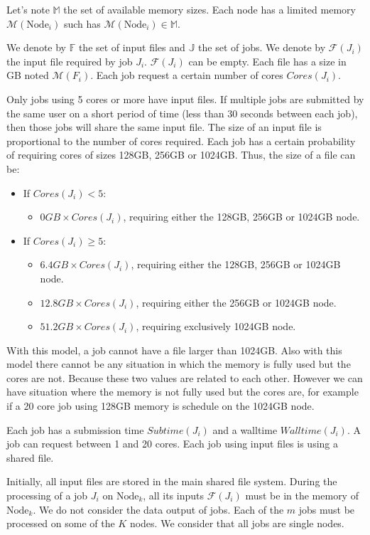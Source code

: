 \documentclass[a4paper]{article}
\newcommand{\Node}[1]{\ensuremath{\mathrm{Node}_{#1}}\xspace}
\newcommand{\inputs}{\ensuremath{\mathcal{F}}\xspace}
\newcommand{\memory}{\ensuremath{\mathcal{M}}\xspace}
\newcommand{\core}{\mathit{Cores}\xspace}
\newcommand{\submissiontime}{\mathit{Subtime}\xspace}
\newcommand{\walltime}{\mathit{Walltime}\xspace}
\newcommand{\fileset}{\ensuremath{\mathbb{F}}\xspace}
\newcommand{\jobset}{\ensuremath{\mathbb{J}}\xspace}
\begin{document}
Let's note $\mathbb{M}$ the set of available memory sizes.
Each node has a limited memory $\memory(\Node{i})$ such has $\memory(\Node{i}) \in \mathbb{M}$.

We denote by $\fileset$ the set of input files and $\jobset$ the set of jobs.
We denote by $\inputs(J_i)$ the input file required by job $J_i$. $\inputs(J_i)$ can be empty.
Each file has a size in GB noted $\memory(F_i)$. 
Each job request a certain number of cores $\core(J_i)$. 


Only jobs using 5 cores or more have input files.
If multiple jobs are submitted by the same user on a short period of time (less than 30 seconds between each job),
then those jobs will share the same input file.
The size of an input file is proportional to the number of cores required.
Each job has a certain probability of requiring cores of sizes 128GB, 256GB or 1024GB.
Thus, the size of a file can be:
\begin{itemize}
	\item If $\core(J_i) < 5$:
	\begin{itemize}
		\item $0GB \times \core(J_i)$, requiring either the 128GB, 256GB or 1024GB node.
	\end{itemize}
	\item If $\core(J_i) \ge 5$:
	\begin{itemize}
		\item $6.4GB \times \core(J_i)$, requiring either the 128GB, 256GB or 1024GB node.
		\item $12.8GB \times \core(J_i)$, requiring either the 256GB or 1024GB node.
		\item $51.2GB \times \core(J_i)$, requiring exclusively 1024GB node.
	\end{itemize}
\end{itemize}
With this model, a job cannot have a file larger than 1024GB.
Also with this model there cannot be any situation in which the memory is fully used
but the cores are not. Because these two values are related to each other. 
However we can have situation where the memory is not fully used but the cores are,
for example if a 20 core job using 128GB memory is schedule on the 1024GB node.

Each job has a submission time $\submissiontime(J_i)$ and a walltime $\walltime(J_i)$.
A job can request between 1 and 20 cores.
Each job using input files is using a shared file.

Initially, all input files are stored in the main shared file system.
During the processing of a job $J_i$ on $\Node{k}$, all its inputs
$\inputs(J_i)$ must be in the memory of $\Node{k}$. 
We do not consider the data output of jobs.
Each of the $m$ jobs must be processed on some of the $K$ nodes. 
We consider that all jobs are single nodes.
\end{document}

